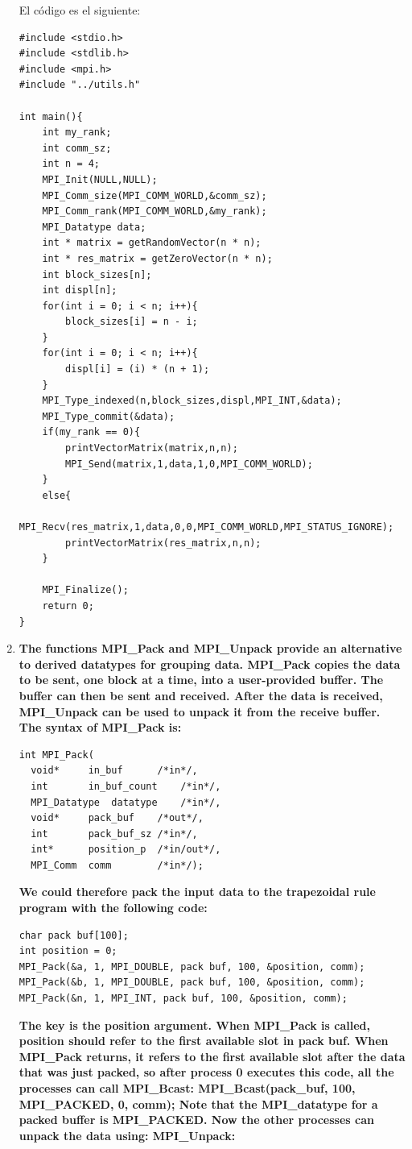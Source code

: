 \documentclass[a4paper,12pt]{article}
\begin{document}
\begin{enumerate}
El código es el siguiente:

\begin{lstlisting}
#include <stdio.h>
#include <stdlib.h>
#include <mpi.h>
#include "../utils.h"

int main(){
	int my_rank;
	int comm_sz;
	int n = 4;
	MPI_Init(NULL,NULL);
	MPI_Comm_size(MPI_COMM_WORLD,&comm_sz);
	MPI_Comm_rank(MPI_COMM_WORLD,&my_rank);
	MPI_Datatype data;
	int * matrix = getRandomVector(n * n);
	int * res_matrix = getZeroVector(n * n);
	int block_sizes[n];
	int displ[n];
	for(int i = 0; i < n; i++){
		block_sizes[i] = n - i;
	}
	for(int i = 0; i < n; i++){
		displ[i] = (i) * (n + 1);
	}
	MPI_Type_indexed(n,block_sizes,displ,MPI_INT,&data);
	MPI_Type_commit(&data);
	if(my_rank == 0){
		printVectorMatrix(matrix,n,n);
		MPI_Send(matrix,1,data,1,0,MPI_COMM_WORLD);
	} 
	else{
		MPI_Recv(res_matrix,1,data,0,0,MPI_COMM_WORLD,MPI_STATUS_IGNORE);	
		printVectorMatrix(res_matrix,n,n);
	} 
	
	MPI_Finalize();
	return 0;
}
\end{lstlisting}

\item{ \textbf{The functions MPI\_Pack and MPI\_Unpack provide an alternative to derived datatypes for grouping
data. MPI\_Pack copies the data to be sent, one block at a time, into a user-provided buffer. The buffer
can then be sent and received. After the data is received, MPI\_Unpack can be used to unpack it from the
receive buffer. The syntax of MPI\_Pack is:}

\begin{lstlisting}
int MPI_Pack(
  void*		in_buf		/*in*/,
  int		in_buf_count	/*in*/,
  MPI_Datatype	datatype	/*in*/,
  void*		pack_buf	/*out*/,
  int		pack_buf_sz	/*in*/,
  int*		position_p	/*in/out*/,
  MPI_Comm	comm		/*in*/);
\end{lstlisting}

\textbf{We could therefore pack the input data to the trapezoidal rule program with the following code:}

\begin{lstlisting}
char pack buf[100];
int position = 0;
MPI_Pack(&a, 1, MPI_DOUBLE, pack buf, 100, &position, comm);
MPI_Pack(&b, 1, MPI_DOUBLE, pack buf, 100, &position, comm);
MPI_Pack(&n, 1, MPI_INT, pack buf, 100, &position, comm);
\end{lstlisting}

\textbf{The key is the position argument. When MPI\_Pack is called, position should refer to the first
available slot in pack buf. When MPI\_Pack returns, it refers to the first available slot after the data
that was just packed, so after process 0 executes this code, all the processes can call MPI\_Bcast:
MPI\_Bcast(pack\_buf, 100, MPI\_PACKED, 0, comm); Note that the MPI\_datatype for a packed buffer is
MPI\_PACKED. Now the other processes can unpack the data using: MPI\_Unpack:}

}
\end{enumerate}
\end{document}
